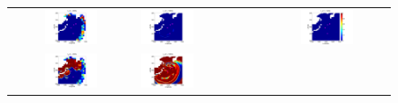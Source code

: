 \documentclass[review,12pt]{elsarticle}
\begin{document}
\begin{figure}[ht]
\begin{tabular}{clc}
 \hspace*{-55pt}
\includegraphics[width=0.45\textwidth]{Figure11a.pdf} &
\hspace*{-45pt}
\includegraphics[width=0.45\textwidth]{Figure11b.pdf} &
\hspace*{-45pt}
\includegraphics[width=0.45\textwidth]{Figure11c.pdf} \\
\hspace*{-55pt}
\includegraphics[width=0.45\textwidth]{Figure11d.pdf} &
\hspace*{-45pt}
\includegraphics[width=0.45\textwidth]{Figure11e.pdf} &

\end{tabular}
\end{figure}
\end{document}
